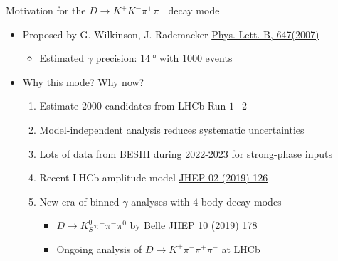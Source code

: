 \documentclass{beamer}
\begin{document}
\begin{frame}{Motivation for the $D\to K^+K^-\pi^+\pi^-$ decay mode}
  \begin{itemize}
    \setlength\itemsep{1.3em}
    \item{Proposed by G. Wilkinson, J. Rademacker \href{https://arxiv.org/abs/hep-ph/0611272}{Phys. Lett. B, 647(2007)}}
    \begin{itemize}
      \item{Estimated $\gamma$ precision: $\SI{14}{\degree}$ with $1000$ events}
    \end{itemize}
    \item{Why this mode? Why now?}
    \begin{enumerate}
      \setlength\itemsep{1.0em}
      \item{Estimate $2000$ candidates from LHCb Run $1$+$2$}
      \item{Model-independent analysis reduces systematic uncertainties}
      \item{Lots of data from BESIII during 2022-2023 for strong-phase inputs}
      \item{Recent LHCb amplitude model \href{https://arxiv.org/abs/1811.08304}{JHEP 02 (2019) 126}}
      \item{New era of binned $\gamma$ analyses with $4$-body decay modes}
      \begin{itemize}
        \item{$D\to K_S^0\pi^+\pi^-\pi^0$ by Belle \href{https://arxiv.org/abs/1908.09499}{JHEP 10 (2019) 178}}
        \item{Ongoing analysis of $D\to K^+\pi^-\pi^+\pi^-$ at LHCb}
      \end{itemize}
    \end{enumerate}
  \end{itemize}
\end{frame}
\end{document}
